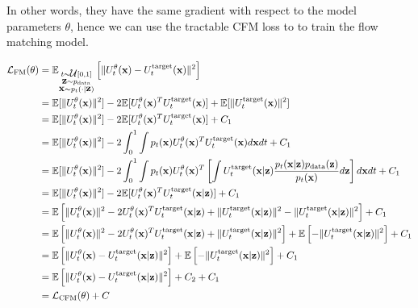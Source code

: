 \documentclass[a4paper, 11pt]{article}
\begin{document}
In other words, they have the same gradient with respect to the model parameters $\theta$, hence we can use the tractable CFM loss to to train the flow matching model.


\begin{align}
    \fL_{\text{FM}}(\theta) &= \E_{\substack{t \sim \fU[0, 1] \\ 
    \vz \sim p_{\text{data}} \\
    \vx \sim p_t(\cdot | \vz)}} \left [ \|U_t^{\theta}(\vx) - U_t^{\text{target}}(\vx) \|^2 \right ] \\
    &= \E [ \|U_t^{\theta}(\vx) \|^2 ] - 2 \E [U_t^{\theta}(\vx)^T U_t^{\text{target}}(\vx)  ] + \E[\|U_t^{\text{target}}(\vx)\|^2] \\
    &= \E [ \|U_t^{\theta}(\vx) \|^2 ] - 2 \E [U_t^{\theta}(\vx)^T U_t^{\text{target}}(\vx)  ] + C_1 \\
    &= \E [ \|U_t^{\theta}(\vx) \|^2 ] - 2 \int_0^1 \int p_t(\vx) U_t^{\theta}(\vx)^T U_t^{\text{target}}(\vx) d\vx dt  + C_1 \\
    &= \E [ \|U_t^{\theta}(\vx) \|^2 ] - 2 \int_0^1 \int p_t(\vx) U_t^{\theta}(\vx)^T \left [ \int U_t^{\text{target}}(\vx | \vz) \frac{p_t( \vx|\vz)p_{\text{data}}(\vz)}{p_t(\vx)} d\vz \right ] d\vx dt  + C_1 \\
    &= \E [ \|U_t^{\theta}(\vx) \|^2 ] - 2 \E [U_t^{\theta}(\vx)^T U_t^{\text{target}}(\vx | \vz)  ]  + C_1 \\
    &= \E \left [ \|U_t^{\theta}(\vx) \|^2  - 2U_t^{\theta}(\vx)^T U_t^{\text{target}}(\vx | \vz)  + \|U_t^{\text{target}}(\vx | \vz)\|^2 - \|U_t^{\text{target}}(\vx | \vz)\|^2 \right ]  + C_1 \\
    &= \E \left [ \|U_t^{\theta}(\vx) \|^2  - 2U_t^{\theta}(\vx)^T U_t^{\text{target}}(\vx | \vz)  + \|U_t^{\text{target}}(\vx | \vz)\|^2 \right ] + \E \left  [- \|U_t^{\text{target}}(\vx | \vz)\|^2 \right ]  + C_1 \\
    &= \E \left [ \|U_t^{\theta}(\vx) - U_t^{\text{target}}(\vx | \vz) \|^2 \right ] + \E \left  [- \|U_t^{\text{target}}(\vx | \vz)\|^2 \right ]  + C_1 \\
    &= \E \left [ \|U_t^{\theta}(\vx) - U_t^{\text{target}}(\vx | \vz) \|^2 \right ] + C_2  + C_1 \\
    &= \fL_{\text{CFM}}(\theta) + C
\end{align}
\end{document}
